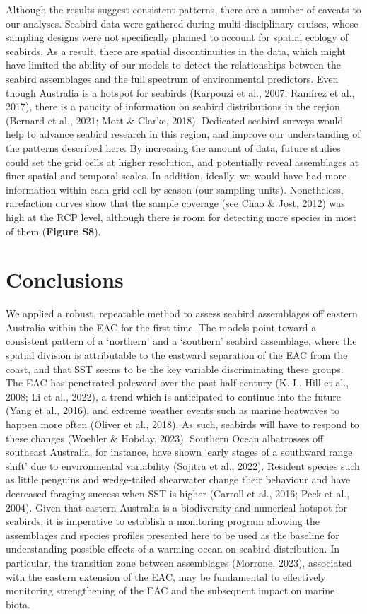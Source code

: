 \documentclass{article}
\begin{document}
\begin{linenumbers}
Although the results suggest consistent patterns, there are a number of caveats to our analyses. Seabird data were gathered during multi-disciplinary cruises, whose sampling designs were not specifically planned to account for spatial ecology of seabirds. As a result, there are spatial discontinuities in the data, which might have limited the ability of our models to detect the relationships between the seabird assemblages and the full spectrum of environmental predictors. Even though Australia is a hotspot for seabirds (Karpouzi et al., 2007; Ramírez et al., 2017), there is a paucity of information on seabird distributions in the region (Bernard et al., 2021; Mott \& Clarke, 2018). Dedicated seabird surveys would help to advance seabird research in this region, and improve our understanding of the patterns described here. By increasing the amount of data, future studies could set the grid cells at higher resolution, and potentially reveal assemblages at finer spatial and temporal scales. In addition, ideally, we would have had more information within each grid cell by season (our sampling units). Nonetheless, rarefaction curves show that the sample coverage (see Chao \& Jost, 2012) was high at the RCP level, although there is room for detecting more species in most of them (\textbf{Figure S8}).

\hypertarget{conclusions}{%
\section{Conclusions}\label{conclusions}}

We applied a robust, repeatable method to assess seabird assemblages off eastern Australia within the EAC for the first time. The models point toward a consistent pattern of a `northern' and a `southern' seabird assemblage, where the spatial division is attributable to the eastward separation of the EAC from the coast, and that SST seems to be the key variable discriminating these groups. The EAC has penetrated poleward over the past half-century (K. L. Hill et al., 2008; Li et al., 2022), a trend which is anticipated to continue into the future (Yang et al., 2016), and extreme weather events such as marine heatwaves to happen more often (Oliver et al., 2018). As such, seabirds will have to respond to these changes (Woehler \& Hobday, 2023). Southern Ocean albatrosses off southeast Australia, for instance, have shown `early stages of a southward range shift' due to environmental variability (Sojitra et al., 2022). Resident species such as little penguins and wedge-tailed shearwater change their behaviour and have decreased foraging success when SST is higher (Carroll et al., 2016; Peck et al., 2004). Given that eastern Australia is a biodiversity and numerical hotspot for seabirds, it is imperative to establish a monitoring program allowing the assemblages and species profiles presented here to be used as the baseline for understanding possible effects of a warming ocean on seabird distribution. In particular, the transition zone between assemblages (Morrone, 2023), associated with the eastern extension of the EAC, may be fundamental to effectively monitoring strengthening of the EAC and the subsequent impact on marine biota.


\end{linenumbers}
\end{document}
